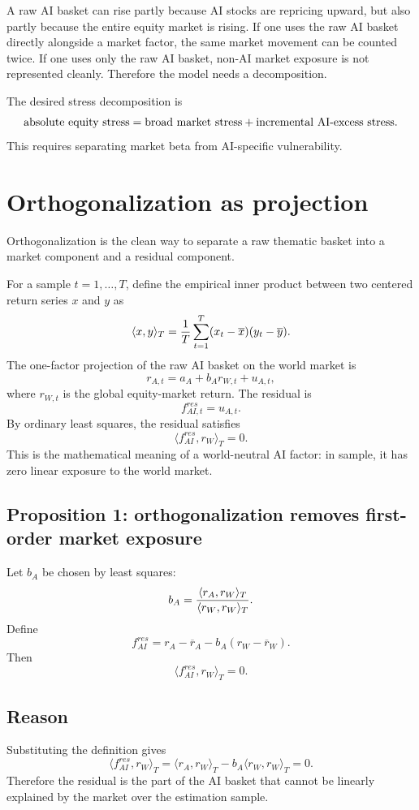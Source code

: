 \documentclass[11pt]{article}
\begin{document}
A raw AI basket can rise partly because AI stocks are repricing upward, but also partly because the entire equity market is rising. If one uses the raw AI basket directly alongside a market factor, the same market movement can be counted twice. If one uses only the raw AI basket, non-AI market exposure is not represented cleanly. Therefore the model needs a decomposition.

The desired stress decomposition is
\[
\hbox{absolute equity stress}=
\hbox{broad market stress}+\hbox{incremental AI-excess stress}.
\]
This requires separating market beta from AI-specific vulnerability.

\section{Orthogonalization as projection}

Orthogonalization is the clean way to separate a raw thematic basket into a market component and a residual component.

For a sample $t=1,\ldots,T$, define the empirical inner product between two centered return series $x$ and $y$ as
\[
\langle x,y\rangle_T
=
{1\over T}\sum_{t=1}^T (x_t-\overline x)(y_t-\overline y).
\]
The one-factor projection of the raw AI basket on the world market is
\[
r_{A,t}=a_A+b_A r_{W,t}+u_{A,t},
\]
where $r_{W,t}$ is the global equity-market return. The residual is
\[
f_{AI,t}^{res}=u_{A,t}.
\]
By ordinary least squares, the residual satisfies
\[
\langle f_{AI}^{res},r_W\rangle_T=0.
\]
This is the mathematical meaning of a world-neutral AI factor: in sample, it has zero linear exposure to the world market.

\subsection*{Proposition 1: orthogonalization removes first-order market exposure}

Let $b_A$ be chosen by least squares:
\[
b_A={\langle r_A,r_W\rangle_T\over \langle r_W,r_W\rangle_T}.
\]
Define
\[
f_{AI}^{res}=r_A-\overline r_A-b_A(r_W-\overline r_W).
\]
Then
\[
\langle f_{AI}^{res},r_W\rangle_T=0.
\]

\subsection*{Reason}

Substituting the definition gives
\[
\langle f_{AI}^{res},r_W\rangle_T
=
\langle r_A,r_W\rangle_T
-b_A\langle r_W,r_W\rangle_T=0.
\]
Therefore the residual is the part of the AI basket that cannot be linearly explained by the market over the estimation sample.
\end{document}
